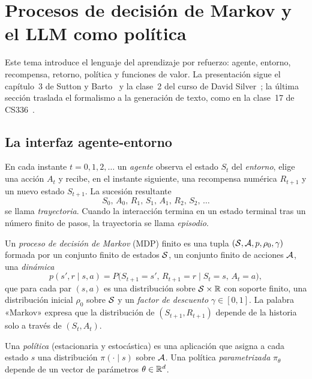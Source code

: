 \chapter{Procesos de decisión de Markov y el LLM como política}
\label{tema:1}

Este tema introduce el lenguaje del aprendizaje por refuerzo: agente, entorno, recompensa, retorno, política y funciones de valor. La presentación sigue el capítulo~3 de Sutton y Barto~\cite{sb} y la clase~2 del curso de David Silver~\cite{silver}; la última sección traslada el formalismo a la generación de texto, como en la clase~17 de CS336~\cite{cs336}.

\section{La interfaz agente-entorno}

En cada instante $t=0,1,2,\dots$ un \emph{agente} observa el estado $S_t$ del \emph{entorno}, elige una acción $A_t$ y recibe, en el instante siguiente, una recompensa numérica $R_{t+1}$ y un nuevo estado $S_{t+1}$. La sucesión resultante
\[
S_0,\,A_0,\,R_1,\,S_1,\,A_1,\,R_2,\,S_2,\,\dots
\]
se llama \emph{trayectoria}. Cuando la interacción termina en un estado terminal tras un número finito de pasos, la trayectoria se llama \emph{episodio}.

\begin{definicion}\label{def:mdp}
Un \emph{proceso de decisión de Markov} (MDP) finito es una tupla $(\mathcal{S},\mathcal{A},p,\rho_0,\gamma)$ formada por un conjunto finito de estados $\mathcal{S}$, un conjunto finito de acciones $\mathcal{A}$, una \emph{dinámica}
\[
p(s',r\mid s,a)=P\bigl(S_{t+1}=s',\,R_{t+1}=r\mid S_t=s,\,A_t=a\bigr),
\]
que para cada par $(s,a)$ es una distribución sobre $\mathcal{S}\times\mathbb{R}$ con soporte finito, una distribución inicial $\rho_0$ sobre $\mathcal{S}$ y un \emph{factor de descuento} $\gamma\in[0,1]$. La palabra «Markov» expresa que la distribución de $(S_{t+1},R_{t+1})$ depende de la historia solo a través de $(S_t,A_t)$.
\end{definicion}

\begin{definicion}[Política]\label{def:politica}
Una \emph{política} (estacionaria y estocástica) es una aplicación que asigna a cada estado $s$ una distribución $\pi(\cdot\mid s)$ sobre $\mathcal{A}$. Una política \emph{parametrizada} $\pi_\theta$ depende de un vector de parámetros $\theta\in\mathbb{R}^{d}$.
\end{definicion}

